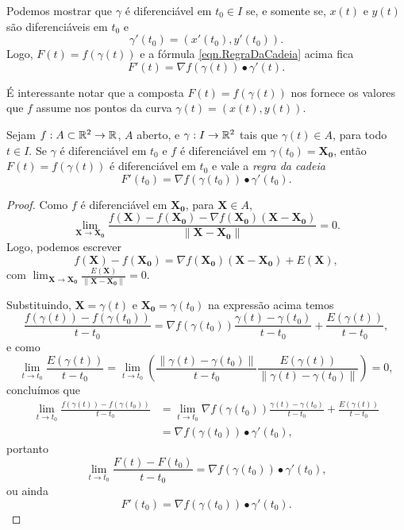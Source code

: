 Podemos mostrar que \(\gamma\) é diferenciável em \(t_0\in I\) se, e somente se, \(x(t)\) e \(y(t)\) são diferenciáveis em \(t_0\) e \[\gamma'(t_0) = (x'(t_0),y'(t_0)).\] Logo, \(F(t) = f(\gamma(t))\) e a fórmula \eqref{eqn.RegraDaCadeia} acima fica
    \begin{equation}\label{eqn.RegraDaCadeia1}
        F'(t) = \nabla f(\gamma(t))\bullet\gamma'(t).
    \end{equation}

\begin{remark}
    É interessante notar que a composta \(F(t) = f(\gamma(t))\) nos fornece os valores que \(f\) assume nos pontos da curva \(\gamma(t) = (x(t),y(t))\).
\end{remark}

\begin{theorem}\label{thm.RegraDaCadeiaFraca}
    Sejam \(f:A\subset \mathbb{R}^2 \to \mathbb{R}\), \(A\) aberto, e \(\gamma: I \to \mathbb{R}^2\) tais que \(\gamma(t)\in A\), para todo \(t\in I\). Se \(\gamma\) é diferenciável em \(t_0\) e \(f\) é diferenciável em \(\gamma(t_0) = \mathbf{X_0}\), então \(F(t) = f(\gamma(t))\) é diferenciável em \(t_0\) e vale a \textit{regra da cadeia} \[F'(t_0) = \nabla f(\gamma(t_0))\bullet \gamma'(t_0).\]
\end{theorem}

\begin{proof}
    Como \(f\) é diferenciável em \(\mathbf{X_0}\), para \(\mathbf{X}\in A\), \[\lim_{\mathbf{X}\to\mathbf{X_0}} \frac{f(\mathbf{X}) - f(\mathbf{X_0}) - \nabla f(\mathbf{X_0})(\mathbf{X} - \mathbf{X_0})}{\|\mathbf{X} - \mathbf{X_0}\|} = 0.\] Logo, podemos escrever \[ f(\mathbf{X}) - f(\mathbf{X_0}) = \nabla f(\mathbf{X_0})(\mathbf{X} - \mathbf{X_0}) + E(\mathbf{X}), \] com \(\lim_{\mathbf{X}\to\mathbf{X_0}} \frac{E(\mathbf{X})}{\|\mathbf{X} - \mathbf{X_0}\|} = 0\).

    Substituindo, \(\mathbf{X} = \gamma(t)\) e \(\mathbf{X_0} = \gamma(t_0)\) na expressão acima temos \[\frac{f(\gamma(t)) - f(\gamma(t_0))}{t - t_0} = \nabla f(\gamma(t_0)) \frac{\gamma(t) - \gamma(t_0)}{t-t_0} + \frac{E(\gamma(t))}{t-t_0},\] e como \[\lim_{t\to t_0} \frac{E(\gamma(t))}{t-t_0} = \lim_{t\to t_0} \left( \frac{\|\gamma(t) - \gamma(t_0)\|}{t-t_0} \frac{E(\gamma(t))}{\|\gamma(t) - \gamma(t_0)\|} \right) = 0,\] concluímos que
        \begin{align*}
            \lim_{t\to t_0} \frac{f(\gamma(t)) - f(\gamma(t_0))}{t-t_0} 
            & = \lim_{t\to t_0} \nabla f(\gamma(t_0)) \frac{\gamma(t) - \gamma(t_0)}{t-t_0} + \frac{E(\gamma(t))}{t-t_0} \\
            & = \nabla f(\gamma(t_0))\bullet \gamma'(t_0),
        \end{align*}
    portanto \[\lim_{t\to t_0} \frac{F(t) - F(t_0)}{t-t_0} = \nabla f(\gamma(t_0))\bullet \gamma'(t_0),\] ou ainda \[F'(t_0) = \nabla f(\gamma(t_0))\bullet \gamma'(t_0).\]
\end{proof}

